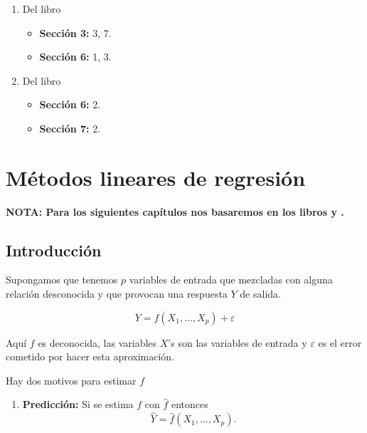 \documentclass[
  12pt,
]{book}
\providecommand{\tightlist}{%
  \setlength{\itemsep}{0pt}\setlength{\parskip}{0pt}}
\theoremstyle{definition}
\theoremstyle{definition}
\theoremstyle{definition}
\theoremstyle{remark}
\begin{document}
\begin{enumerate}
\def\labelenumi{\arabic{enumi}.}
\tightlist
\item
  Del libro \autocite{Albert2009}

  \begin{itemize}
  \tightlist
  \item
    \textbf{Sección 3:} 3, 7.
  \item
    \textbf{Sección 6:} 1, 3.
  \end{itemize}
\item
  Del libro \autocite{Kruschke2014}

  \begin{itemize}
  \tightlist
  \item
    \textbf{Sección 6:} 2.
  \item
    \textbf{Sección 7:} 2.
  \end{itemize}
\end{enumerate}

\hypertarget{muxe9todos-lineares-de-regresiuxf3n}{%
\chapter{Métodos lineares de regresión}\label{muxe9todos-lineares-de-regresiuxf3n}}

\textbf{NOTA: Para los siguientes capítulos nos basaremos en los libros \autocite{Hastie2009a} y \autocite{James2013b}.}

\hypertarget{introducciuxf3n-1}{%
\section{Introducción}\label{introducciuxf3n-1}}

Supongamos que tenemos \(p\) variables de entrada que mezcladas con alguna relación desconocida y que provocan una respuesta \(Y\) de salida.

\begin{equation}
Y = f(X_{1},\ldots,X_{p}) + \varepsilon
\label{eq:regresion-general}
\end{equation}

Aquí \(f\) es deconocida, las variables \(X\)'s son las variables de entrada y \(\varepsilon\) es el error cometido por hacer esta aproximación.

Hay dos motivos para estimar \(f\)

\begin{enumerate}
\def\labelenumi{\arabic{enumi}.}
\tightlist
\item
  \textbf{Predicción:} Si se estima \(f\) con \(\hat{f}\) entonces
  \begin{equation*}
  \hat{Y} = \hat{f}(X_{1},\ldots,X_{p}). 
  \end{equation*}
\end{enumerate}
\end{document}
